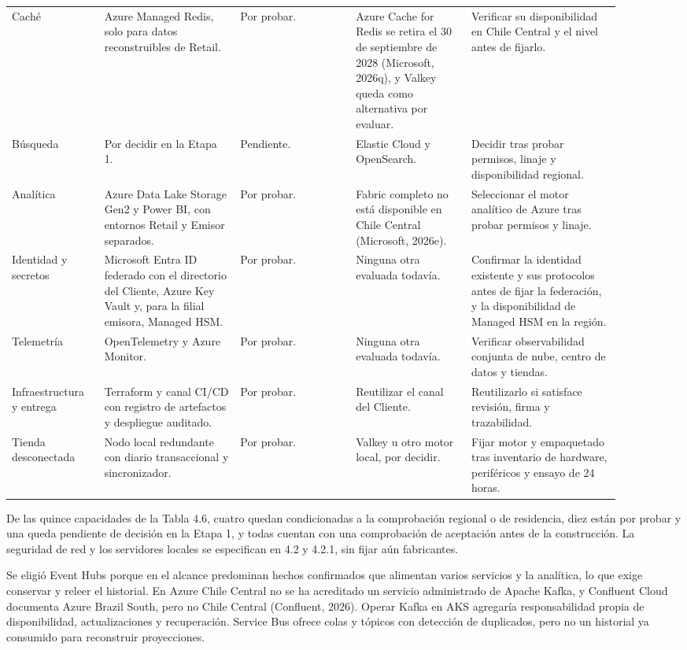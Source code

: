 \documentclass[11pt]{article}
\begin{document}
\begin{longtable}{@{}p{0.135\linewidth}p{0.2\linewidth}p{0.17\linewidth}p{0.17\linewidth}p{0.225\linewidth}@{}}
Caché & Azure Managed Redis, solo para datos reconstruibles de Retail. & Por probar. & Azure Cache for Redis se retira el 30 de septiembre de 2028 (Microsoft, 2026q), y Valkey queda como alternativa por evaluar. & Verificar su disponibilidad en Chile Central y el nivel antes de fijarlo. \\
Búsqueda & Por decidir en la Etapa 1. & Pendiente. & Elastic Cloud y OpenSearch. & Decidir tras probar permisos, linaje y disponibilidad regional. \\
Analítica & Azure Data Lake Storage Gen2 y Power BI, con entornos Retail y Emisor separados. & Por probar. & Fabric completo no está disponible en Chile Central (Microsoft, 2026e). & Seleccionar el motor analítico de Azure tras probar permisos y linaje. \\
Identidad y secretos & Microsoft Entra ID federado con el directorio del Cliente, Azure Key Vault y, para la filial emisora, Managed HSM. & Por probar. & Ninguna otra evaluada todavía. & Confirmar la identidad existente y sus protocolos antes de fijar la federación, y la disponibilidad de Managed HSM en la región. \\
Telemetría & OpenTelemetry y Azure Monitor. & Por probar. & Ninguna otra evaluada todavía. & Verificar observabilidad conjunta de nube, centro de datos y tiendas. \\
Infraestructura y entrega & Terraform y canal CI/CD con registro de artefactos y despliegue auditado. & Por probar. & Reutilizar el canal del Cliente. & Reutilizarlo si satisface revisión, firma y trazabilidad. \\
Tienda desconectada & Nodo local redundante con diario transaccional y sincronizador. & Por probar. & Valkey u otro motor local, por decidir. & Fijar motor y empaquetado tras inventario de hardware, periféricos y ensayo de 24 horas. \\
\end{longtable}

De las quince capacidades de la Tabla 4.6, cuatro quedan condicionadas a la comprobación regional o de residencia, diez están por probar y una queda pendiente de decisión en la Etapa 1, y todas cuentan con una comprobación de aceptación antes de la construcción. La seguridad de red y los servidores locales se especifican en 4.2 y 4.2.1, sin fijar aún fabricantes.

Se eligió Event Hubs porque en el alcance predominan hechos confirmados que alimentan varios servicios y la analítica, lo que exige conservar y releer el historial. En Azure Chile Central no se ha acreditado un servicio administrado de Apache Kafka, y Confluent Cloud documenta Azure Brazil South, pero no Chile Central (Confluent, 2026). Operar Kafka en AKS agregaría responsabilidad propia de disponibilidad, actualizaciones y recuperación. Service Bus ofrece colas y tópicos con detección de duplicados, pero no un historial ya consumido para reconstruir proyecciones.
\end{document}
